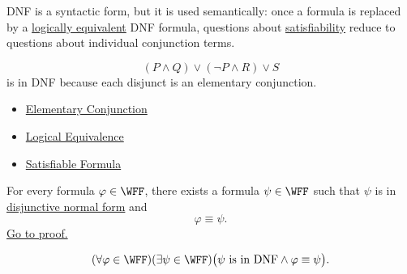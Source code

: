 \begin{remark*}[Interpretation]
DNF is a syntactic form, but it is used semantically: once a formula is replaced
by a \hyperref[def:logical-equivalence-propositional-logic]{logically equivalent}
DNF formula, questions about
\hyperref[def:satisfiable-formula-propositional-logic]{satisfiability} reduce
to questions about individual conjunction terms.
\end{remark*}

\begin{example*}[Examples]
\[
(P\land Q)\lor(\neg P\land R)\lor S
\]
is in DNF because each disjunct is an elementary conjunction.
\end{example*}

\begin{dependencies}
\begin{itemize}
  \item \hyperref[def:elementary-conjunction-propositional-logic]{Elementary Conjunction}
  \item \hyperref[def:logical-equivalence-propositional-logic]{Logical Equivalence}
  \item \hyperref[def:satisfiable-formula-propositional-logic]{Satisfiable Formula}
\end{itemize}
\end{dependencies}

\begin{tcolorbox}[colback=thmbox, colframe=thmborder, arc=2pt, left=6pt, right=6pt, top=4pt, bottom=4pt, title={\small\textbf{Theorem (Existence of Disjunctive Normal Form)}}]
\begin{theorem}
\label{thm:existence-disjunctive-normal-form-propositional-logic}
For every formula \(\varphi\in\WFF\), there exists a formula
\(\psi\in\WFF\) such that \(\psi\) is in
\hyperref[def:disjunctive-normal-form-propositional-logic]{disjunctive normal form}
and
\[
\varphi\equiv\psi.
\]
\noindent\hyperref[prf:existence-disjunctive-normal-form-propositional-logic]{Go to proof.}
\end{theorem}
\end{tcolorbox}

\begin{remark*}
\[
(\forall\varphi\in\WFF)(\exists\psi\in\WFF)
\bigl(\psi\text{ is in DNF}\land \varphi\equiv\psi\bigr).
\]
\end{remark*}

